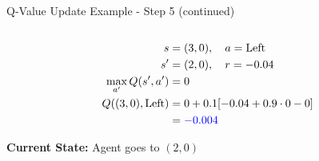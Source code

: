 \documentclass[aspectratio=169]{beamer}
\begin{document}
\begin{frame}{Q-Value Update Example - Step 5 (continued)}
\begin{columns}
        \begin{column}{0.5\textwidth}
            
            \begin{align}
                s &= (3,0), \quad a = \text{Left} \\
                s' &= (2,0), \quad r = -0.04 \\
                \max_{a'}Q(s',a') &= 0 \\
                Q((3,0),\text{Left}) &= 0 + 0.1[-0.04 + 0.9 \cdot 0 - 0] \\
                &= \textcolor{blue}{-0.004}
            \end{align}
            
            \vspace{0.5cm}
            \textbf{Current State:} Agent goes to $(2,0)$
        \end{column}
    \end{columns}
\end{frame}
\end{document}
